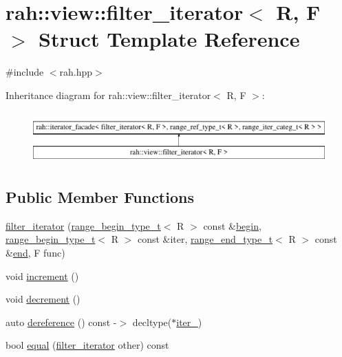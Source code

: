 \hypertarget{structrah_1_1view_1_1filter__iterator}{}\section{rah\+::view\+::filter\+\_\+iterator$<$ R, F $>$ Struct Template Reference}
\label{structrah_1_1view_1_1filter__iterator}


{\ttfamily \#include $<$rah.\+hpp$>$}

Inheritance diagram for rah\+::view\+::filter\+\_\+iterator$<$ R, F $>$\+:\begin{figure}[H]
\begin{center}
\leavevmode
\includegraphics[height=1.996435cm]{structrah_1_1view_1_1filter__iterator}
\end{center}
\end{figure}
\subsection*{Public Member Functions}
\begin{DoxyCompactItemize}
\item 
\mbox{\hyperlink{structrah_1_1view_1_1filter__iterator_a31543c024a816c4f3e8fc8937b2a9214}{filter\+\_\+iterator}} (\mbox{\hyperlink{namespacerah_a28aff4eeddcece6be65ff0b956d32d4a}{range\+\_\+begin\+\_\+type\+\_\+t}}$<$ R $>$ const \&\mbox{\hyperlink{namespacerah_ad248c9fcef327fc3e31ef8bf6ea70f6f}{begin}}, \mbox{\hyperlink{namespacerah_a28aff4eeddcece6be65ff0b956d32d4a}{range\+\_\+begin\+\_\+type\+\_\+t}}$<$ R $>$ const \&iter, \mbox{\hyperlink{namespacerah_a9657e24ae477f4482225b133fe286b65}{range\+\_\+end\+\_\+type\+\_\+t}}$<$ R $>$ const \&\mbox{\hyperlink{namespacerah_ac309d041d5f4110ecf2d1b44f4282275}{end}}, F func)
\item 
void \mbox{\hyperlink{structrah_1_1view_1_1filter__iterator_a63278a452be5e546e6fb3aa0b1a90bfb}{increment}} ()
\item 
void \mbox{\hyperlink{structrah_1_1view_1_1filter__iterator_aed445498ffbec0c3e782ddc17314b677}{decrement}} ()
\item 
auto \mbox{\hyperlink{structrah_1_1view_1_1filter__iterator_a14c5ce038b3e25230cb8e837705f56db}{dereference}} () const -\/$>$ decltype($\ast$\mbox{\hyperlink{structrah_1_1view_1_1filter__iterator_ad4016a695a004f72b1a942abd9193c71}{iter\+\_\+}})
\item 
bool \mbox{\hyperlink{structrah_1_1view_1_1filter__iterator_a4ab0c322842146d3011ae7c88deb82f7}{equal}} (\mbox{\hyperlink{structrah_1_1view_1_1filter__iterator}{filter\+\_\+iterator}} other) const
\end{DoxyCompactItemize}
